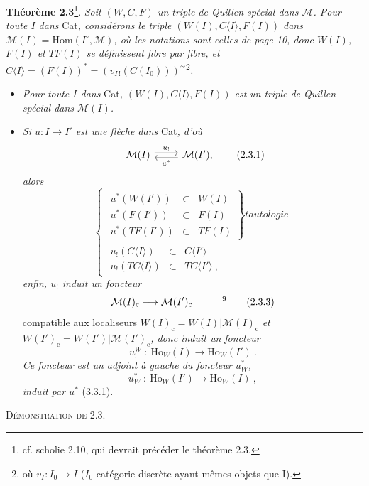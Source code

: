\documentclass[11pt]{article}
\newcommand{\printedpage}[1]{\marginpar{\footnotesize p.~#1}}
\newcommand{\msp}[1]{\marginpar{\footnotesize [#1]}}
\newcommand{\M}{\mathcal{M}}
\newcommand{\Ho}{\mathrm{Ho}}
\newcommand{\cc}{\mathrm{c}}
\begin{document}
\textbf{Théorème 2.3}\footnote[7]{cf. scholie 2.10, qui devrait précéder le théorème 2.3.}. \textit{Soit $(W,C,F)$ un triple de Quillen spécial dans $\M$. Pour toute $I$ dans} Cat\textit{, considérons le triple $(W(I),C\langle I\rangle,F(I))$ dans $\M(I) = \underline{\mathrm{Hom}}(I^{\circ},\M)$, où les notations sont celles de page 10, donc $W(I)$, $F(I)$ et $TF(I)$ se définissent fibre par fibre, et $C\langle I\rangle = (F(I))^* = (v_{I\,!}(C(I_0)))^{\sim}$}\footnote[8]{où $v_I : I_0 \longrightarrow I$ ($I_0$ catégorie discrète ayant mêmes objets que I).}\textit{.}
\begin{itemize}
\item[1°)] \textit{Pour toute $I$ dans} Cat\textit{, $(W(I),C\langle I\rangle,F(I))$ est}
\msp{page 20}
\textit{un triple de Quillen spécial dans $\M(I)$.}
\item[2°)] \textit{Si $u : I \longrightarrow I'$ est une flèche dans} Cat\textit{, d'où}
\[
\begin{tikzcd}
\M(I) \arrow[r, shift left, "u_!"] & \M(I'), \arrow[l, shift left, "u^*"]
\end{tikzcd}
\tag*{(2.3.1)}
\]
\textit{alors}
\[
\left\{
\begin{array}{l}
\left.\begin{array}{rcl}
u^*(W(I')) & \subset & W(I)\\
u^*(F(I')) & \subset & F(I)\\
u^*(TF(I')) & \subset & TF(I)
\end{array}\right\}\textit{tautologie}\\
\begin{array}{rcl}
u_!(C\langle I\rangle) & \subset & C\langle I'\rangle\\
u_!(TC\langle I\rangle) & \subset & TC\langle I'\rangle\ ,
\end{array}
\end{array}\right.
\tag*{(2.3.2)}
\]
\textit{enfin, $u_!$ induit un foncteur}
\[
\M(I)_{\cc} \longrightarrow \M(I')_{\cc} \qquad\quad \text{\footnotemark[9]}
\tag*{(2.3.3)}
\]
compatible aux localiseurs $W(I)_{\cc} = W(I)|\M(I)_{\cc}$ \textit{et} $W(I')_{\cc} = W(I')|\M(I')_{\cc}$\textit{, donc induit un foncteur}
\[
u_!^W\ :\ \Ho_W(I) \longrightarrow \Ho_W(I')\ .
\tag*{(2.3.4)}
\]
\printedpage{13}
\textit{Ce foncteur est un adjoint à gauche du foncteur $u^*_W$,}
\[
u^*_W\ :\ \Ho_W(I') \longrightarrow \Ho_W(I)\ ,
\tag*{(2.3.5)}
\]
\textit{induit par $u^*$} (3.3.1). %
\end{itemize}
\textsc{Démonstration de 2.3.}
\end{document}
